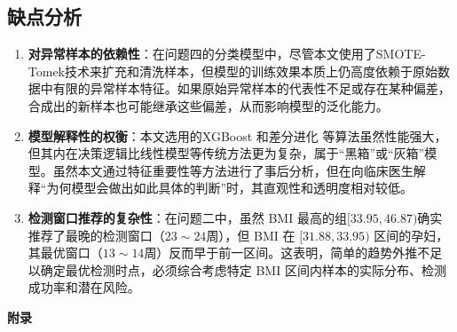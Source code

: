 \documentclass[a4paper, oneside, 12pt]{article}
\begin{document}
\subsection{缺点分析}

\begin{enumerate}

    \item \textbf{对异常样本的依赖性}：在问题四的分类模型中，尽管本文使用了SMOTE-Tomek技术来扩充和清洗样本，但模型的训练效果本质上仍高度依赖于原始数据中有限的异常样本特征。如果原始异常样本的代表性不足或存在某种偏差，合成出的新样本也可能继承这些偏差，从而影响模型的泛化能力。

    \item \textbf{模型解释性的权衡}：本文选用的XGBoost 和差分进化 等算法虽然性能强大，但其内在决策逻辑比线性模型等传统方法更为复杂，属于“黑箱”或“灰箱”模型。虽然本文通过特征重要性等方法进行了事后分析，但在向临床医生解释“为何模型会做出如此具体的判断”时，其直观性和透明度相对较低。

    \item \textbf{检测窗口推荐的复杂性}：在问题二中，虽然 BMI 最高的组$[33.95, 46.87)$确实推荐了最晚的检测窗口（$23 \sim 24$周），但 BMI 在 $[31.88, 33.95)$ 区间的孕妇，其最优窗口（$13 \sim 14$周）反而早于前一区间。这表明，简单的趋势外推不足以确定最优检测时点，必须综合考虑特定 BMI 区间内样本的实际分布、检测成功率和潜在风险。

\end{enumerate}

\newpage

\printbibliography[heading=bibliography,title=参考文献]
% 

\newpage

\begin{center}
    \Large\bfseries
    附录
\end{center}



\end{document}
